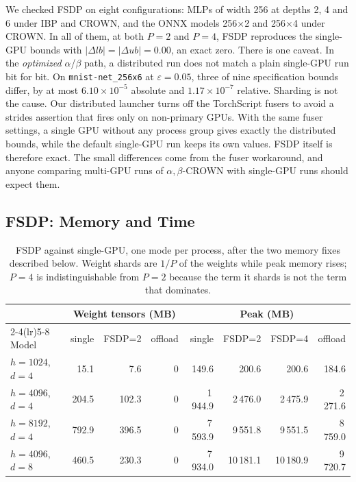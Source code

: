 \documentclass[runningheads]{llncs}
\begin{document}
We checked FSDP on eight configurations: MLPs of width 256 at depths 2, 4 and 6
under IBP and CROWN, and the ONNX models 256$\times$2 and 256$\times$4 under
CROWN. In all of them, at both $P{=}2$ and $P{=}4$, FSDP reproduces the
single-GPU bounds with $|\Delta lb| = |\Delta ub| = 0.00$, an exact zero. There
is one caveat. In the \emph{optimized} $\alpha$/$\beta$ path, a distributed run
does not match a plain single-GPU run bit for bit. On
\texttt{mnist-net\_256x6} at $\varepsilon{=}0.05$, three of nine specification
bounds differ, by at most $6.10\times10^{-5}$ absolute and $1.17\times10^{-7}$
relative. Sharding is not the cause. Our distributed launcher turns off the
TorchScript fusers to avoid a strides assertion that fires only on non-primary
GPUs. With the same fuser settings, a single GPU without any process group
gives exactly the distributed bounds, while the default single-GPU run keeps
its own values. FSDP itself is therefore exact. The small differences come from
the fuser workaround, and anyone comparing multi-GPU runs of
$\alpha,\beta$-CROWN with single-GPU runs should expect them.

\subsection{FSDP: Memory and Time}
\label{sec:exp-fsdp}

\begin{table}[t]
\caption{FSDP against single-GPU, one mode per process, after the two memory fixes described below. Weight shards are $1/P$ of the weights while peak memory rises; $P{=}4$ is indistinguishable from $P{=}2$ because the term it shards is not the term that dominates.}
\label{tab:fsdp-memory}
\small
\centering
\begin{tabular}{lrrrrrrr}
\toprule
& \multicolumn{3}{c}{Weight tensors (MB)} & \multicolumn{4}{c}{Peak (MB)} \\
\cmidrule(lr){2-4}\cmidrule(lr){5-8}
Model & single & FSDP=2 & offload & single & FSDP=2 & FSDP=4 & offload \\
\midrule
$h{=}1024$, $d{=}4$ &  15.1 &   7.6 & 0 &   149.6 &    200.6 &    200.6 &    184.6 \\
$h{=}4096$, $d{=}4$ & 204.5 & 102.3 & 0 & 1\,944.9 & 2\,476.0 & 2\,475.9 & 2\,271.6 \\
$h{=}8192$, $d{=}4$ & 792.9 & 396.5 & 0 & 7\,593.9 & 9\,551.8 & 9\,551.5 & 8\,759.0 \\
$h{=}4096$, $d{=}8$ & 460.5 & 230.3 & 0 & 7\,934.0 &10\,181.1 &10\,180.9 & 9\,720.7 \\
\bottomrule
\end{tabular}
\end{table}
\end{document}
